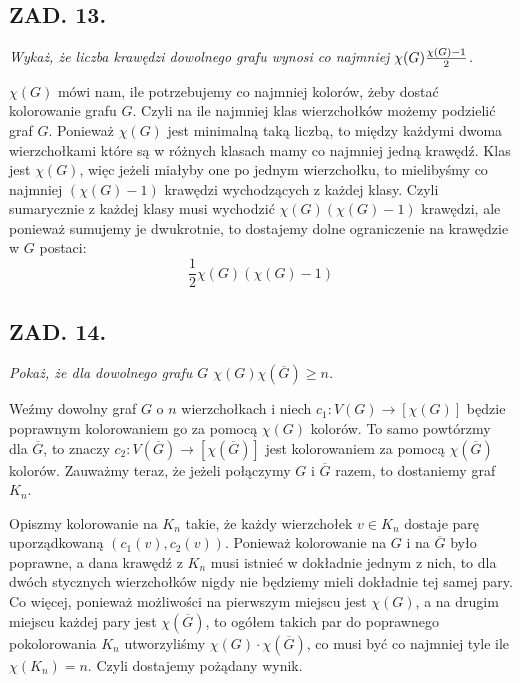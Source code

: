 \documentclass{article}
\begin{document}
\subsection*{ZAD. 13.}
\emph{Wykaż, że liczba krawędzi dowolnego grafu wynosi co najmniej $\chi(G){\chi(G)-1\over2}$.}
\medskip

\medskip

$\chi(G)$ mówi nam, ile potrzebujemy co najmniej kolorów, żeby dostać kolorowanie grafu $G$. Czyli na ile najmniej klas wierzchołków możemy podzielić graf $G$. Ponieważ $\chi(G)$ jest minimalną taką liczbą, to między każdymi dwoma wierzchołkami które są w różnych klasach mamy co najmniej jedną krawędź. Klas jest $\chi(G)$, więc jeżeli miałyby one po jednym wierzchołku, to mielibyśmy co najmniej $(\chi(G)-1)$ krawędzi wychodzących z każdej klasy. Czyli sumarycznie z każdej klasy musi wychodzić $\chi(G)(\chi(G)-1)$ krawędzi, ale ponieważ sumujemy je dwukrotnie, to dostajemy dolne ograniczenie na krawędzie w $G$ postaci:
$$\frac12\chi(G)(\chi(G)-1)$$

\subsection*{ZAD. 14.}
\emph{Pokaż, że dla dowolnego grafu $G$ $\chi(G)\chi(\overline G)\geq n$.}
\medskip

\medskip

Weźmy dowolny graf $G$ o $n$ wierzchołkach i niech $c_1:V(G)\to [\chi(G)]$ będzie poprawnym kolorowaniem go za pomocą $\chi(G)$ kolorów. To samo powtórzmy dla $\overline G$, to znaczy $c_2:V(\overline G)\to[\chi(\overline G)]$ jest kolorowaniem za pomocą $\chi(\overline G)$ kolorów. Zauważmy teraz, że jeżeli połączymy $G$ i $\overline G$ razem, to dostaniemy graf $K_n$. 
\smallskip

Opiszmy kolorowanie na $K_n$ takie, że każdy wierzchołek $v\in K_n$ dostaje parę uporządkowaną $(c_1(v), c_2(v))$. Ponieważ kolorowanie na $G$ i na $\overline G$ było poprawne, a dana krawędź z $K_n$ musi istnieć w dokładnie jednym z nich, to dla dwóch stycznych wierzchołków nigdy nie będziemy mieli dokładnie tej samej pary. Co więcej, ponieważ możliwości na pierwszym miejscu jest $\chi(G)$, a na drugim miejscu każdej pary jest $\chi(\overline G)$, to ogółem takich par do poprawnego pokolorowania $K_n$ utworzyliśmy $\chi(G)\cdot\chi(\overline G)$, co musi być co najmniej tyle ile $\chi(K_n)=n$. Czyli dostajemy pożądany wynik.
\end{document}

